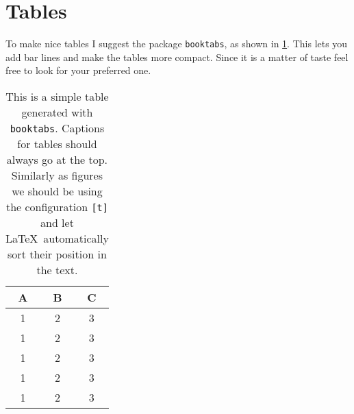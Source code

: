 \section{Tables}

To make nice tables I suggest the package \texttt{booktabs}, as shown in \cref{tab:my_table}. This lets you add bar lines and make the tables more compact. Since it is a matter of taste feel free to look for your preferred one.

\begin{table}[t]
  \centering
  \caption[My first table]{This is a simple table generated with \texttt{booktabs}. Captions for tables should always go at the top. Similarly as figures we should be using the configuration \texttt{[t]} and let \LaTeX\ automatically sort their position in the text.}
  \label{tab:my_table}
  \begin{tabular}{ccc}
    \toprule
    \textbf{A} & \textbf{B} & \textbf{C} \\ \midrule
    1 & 2 & 3 \\
    1 & 2 & 3 \\
    1 & 2 & 3 \\
    1 & 2 & 3 \\
    1 & 2 & 3 \\
    \bottomrule
  \end{tabular}
\end{table}
